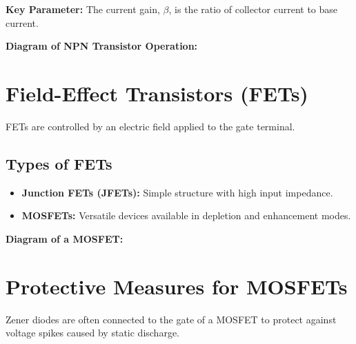 \textbf{Key Parameter:} The current gain, $\beta$, is the ratio of collector current to base current.

\textbf{Diagram of NPN Transistor Operation:}

\begin{center}
\end{center}

\section*{Field-Effect Transistors (FETs)}
FETs are controlled by an electric field applied to the gate terminal.

\subsection{Types of FETs}
\begin{itemize}
    \item \textbf{Junction FETs (JFETs):} Simple structure with high input impedance.
    \item \textbf{MOSFETs:} Versatile devices available in depletion and enhancement modes.
\end{itemize}

\textbf{Diagram of a MOSFET:}

\begin{center}
\end{center}

\section*{Protective Measures for MOSFETs}
Zener diodes are often connected to the gate of a MOSFET to protect against voltage spikes caused by static discharge.

